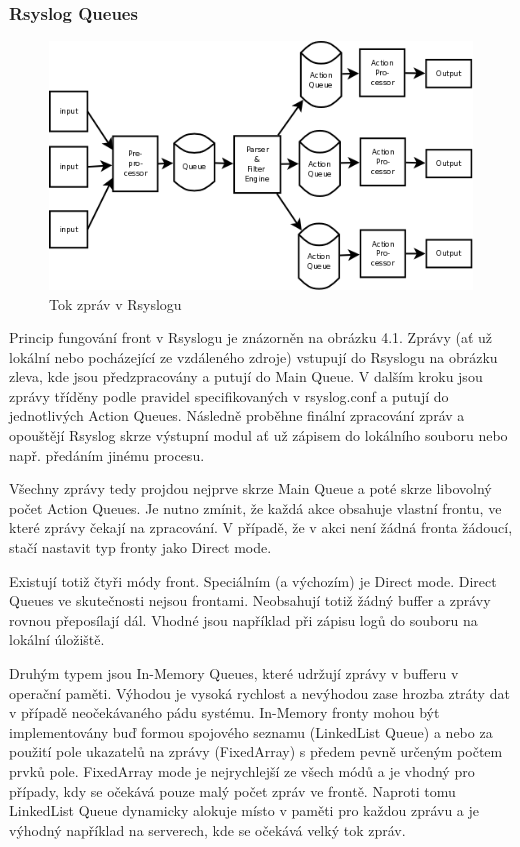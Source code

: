 \documentclass[thesis=B,czech]{FITthesis}[2012/06/26]
\begin{document}
\subsubsection*{Rsyslog Queues}
\begin{figure}[ht]
	\centering
	\includegraphics[scale=0.4]{images/rsyslog-queues}
	\caption[Tok zpráv v Rsyslogu]{Tok zpráv v Rsyslogu~\cite{RsyslogQueues}}
\end{figure}

Princip fungování front v Rsyslogu je znázorněn na obrázku 4.1. Zprávy (ať už lokální nebo pocházející ze vzdáleného zdroje) vstupují do Rsyslogu  na obrázku zleva, kde jsou předzpracovány a putují do Main Queue. V dalším kroku jsou zprávy tříděny podle pravidel specifikovaných v rsyslog.conf a putují do jednotlivých Action Queues. Následně proběhne finální zpracování zpráv a opouštějí Rsyslog skrze výstupní modul ať už zápisem do lokálního souboru nebo např. předáním jinému procesu.

Všechny zprávy tedy projdou nejprve skrze Main Queue a poté skrze libovolný počet Action Queues. Je nutno zmínit, že každá akce obsahuje vlastní frontu, ve které zprávy čekají na zpracování. V případě, že v akci není žádná fronta žádoucí, stačí nastavit typ fronty jako Direct mode.

Existují totiž čtyři módy front. Speciálním (a výchozím) je Direct mode. Direct Queues ve skutečnosti nejsou frontami. Neobsahují totiž žádný buffer a zprávy rovnou přeposílají dál. Vhodné jsou například při zápisu logů do souboru na lokální úložiště.

Druhým typem jsou In-Memory Queues, které udržují zprávy v bufferu v operační paměti. Výhodou je vysoká rychlost a nevýhodou zase hrozba ztráty dat v případě neočekávaného pádu systému.
In-Memory fronty mohou být implementovány buď formou spojového seznamu (LinkedList Queue) a nebo za použití pole ukazatelů na zprávy (FixedArray) s předem pevně určeným počtem prvků pole. FixedArray mode je nejrychlejší ze všech módů a je vhodný pro případy, kdy se očekává pouze malý počet zpráv ve frontě. Naproti tomu LinkedList Queue dynamicky alokuje místo v paměti pro každou zprávu a je výhodný například na serverech, kde se očekává velký tok zpráv.
\end{document}
